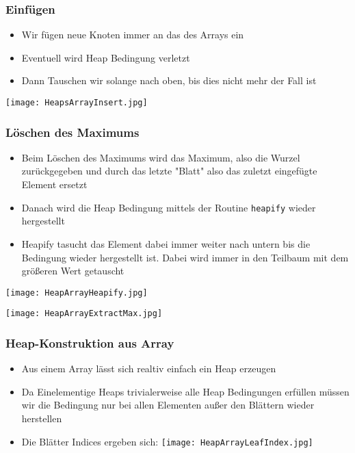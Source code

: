 		\subsubsection{Einfügen}
			\begin{minipage}{0.5\textwidth}
				\begin{itemize}
					\item Wir fügen neue Knoten immer an das des Arrays ein
					\item Eventuell wird Heap Bedingung verletzt
					\item Dann Tauschen wir solange nach oben, bis dies nicht mehr der Fall ist
				\end{itemize}
			\end{minipage}
			\hspace{0.8cm}
			\begin{minipage}{0.45\textwidth}
				\begin{center}
					\texttt{[image: HeapsArrayInsert.jpg]}
				\end{center}
			\end{minipage}


		\subsubsection{Löschen des Maximums}
			\begin{itemize}
				\item Beim Löschen des Maximums wird das Maximum, also die Wurzel zurückgegeben
					und durch das letzte "Blatt" also das zuletzt eingefügte Element ersetzt
				\item Danach wird die Heap Bedingung mittels der Routine \texttt{heapify} wieder
					hergestellt
				\item Heapify tasucht das Element dabei immer weiter nach untern bis die Bedingung 
					wieder hergestellt ist. Dabei wird immer in den Teilbaum mit dem grö\ss eren Wert
					getauscht
			\end{itemize}

			\begin{minipage}{0.56\textwidth}
				\texttt{[image: HeapArrayHeapify.jpg]}
			\end{minipage}
			\begin{minipage}{0.44\textwidth}
				\texttt{[image: HeapArrayExtractMax.jpg]}
			\end{minipage}


		\subsubsection{Heap-Konstruktion aus Array}
			\begin{itemize}
				\item Aus einem Array lässt sich realtiv einfach ein Heap erzeugen
				\item Da Einelementige Heaps trivialerweise alle Heap Bedingungen erfüllen
					müssen wir die Bedingung nur bei allen Elementen außer den Blättern wieder
					herstellen
				\item Die Blätter Indices ergeben sich: \texttt{[image: HeapArrayLeafIndex.jpg]}
			\end{itemize}

